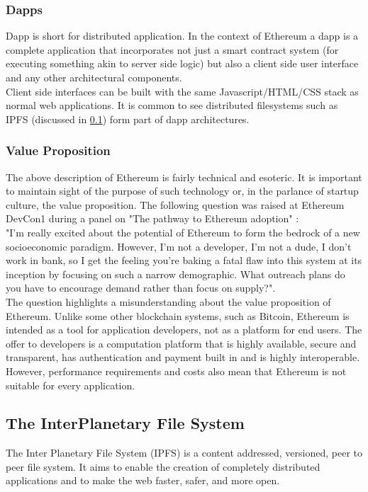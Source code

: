 \subsubsection{Dapps}
Dapp is short for distributed application. In the context of Ethereum a dapp is a complete application that incorporates not just a smart contract system (for executing something akin to server side logic) but also a client side user interface and any other architectural components. \\

Client side interfaces can be built with the same Javascript/HTML/CSS stack as normal web applications. It is common to see distributed filesystems such as IPFS (discussed in \ref{subsec:ipfs}) form part of dapp architectures. 

\subsubsection{Value Proposition}
The above description of Ethereum is fairly technical and esoteric. It is important to maintain sight of the purpose of such technology or, in the parlance of startup culture, the value proposition. The following question was raised at Ethereum DevCon1 during a panel on "The pathway to Ethereum adoption" \cite{devconvid}:\\

"I'm really excited about the potential of Ethereum to form the bedrock of a new socioeconomic paradigm. However, I'm not a developer, I'm not a dude, I don't work in bank, so I get the feeling you're baking a fatal flaw into this system at its inception by focusing on such a narrow demographic. What outreach plans do you have to encourage demand rather than focus on supply?".\\

The question highlights a misunderstanding about the value proposition of Ethereum. Unlike some other blockchain systems, such as Bitcoin, Ethereum is intended as a tool for application developers, not as a platform for end users. The offer to developers is a computation platform that is highly available, secure and transparent, has authentication and payment built in and is highly interoperable. However, performance requirements and costs also mean that Ethereum is not suitable for every application. 

\subsection{The InterPlanetary File System}
\label{subsec:ipfs}
The Inter Planetary File System (IPFS) is a content addressed, versioned, peer to peer file system. It aims to enable the creation of completely distributed applications and to make the web faster, safer, and more open.\\

